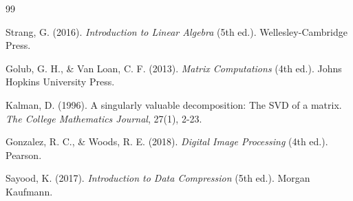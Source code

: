 \documentclass[12pt,a4paper]{article}
\begin{document}
\begin{thebibliography}{99}

Strang, G. (2016). \textit{Introduction to Linear Algebra} (5th ed.). Wellesley-Cambridge Press.

Golub, G. H., \& Van Loan, C. F. (2013). \textit{Matrix Computations} (4th ed.). Johns Hopkins University Press.

Kalman, D. (1996). A singularly valuable decomposition: The SVD of a matrix. \textit{The College Mathematics Journal}, 27(1), 2-23.

Gonzalez, R. C., \& Woods, R. E. (2018). \textit{Digital Image Processing} (4th ed.). Pearson.

Sayood, K. (2017). \textit{Introduction to Data Compression} (5th ed.). Morgan Kaufmann.

\end{thebibliography}
\end{document}
